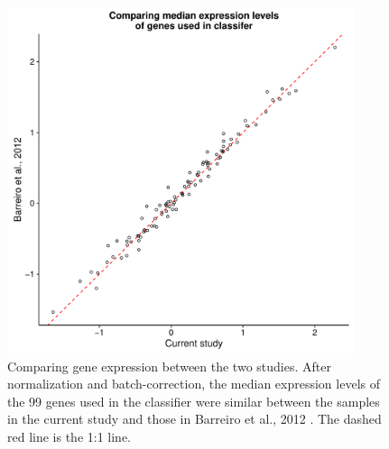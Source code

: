 \documentclass[fleqn,10pt]{wlscirep}
\begin{document}
\begin{figure}[ht]
\centering
\includegraphics[width=4in]{../figure/classifier-exp.pdf}
\caption{
Comparing gene expression between the two studies. After normalization
and batch-correction, the median expression levels of the 99 genes
used in the classifier were similar between the samples in the current
study and those in Barreiro et al., 2012 \cite{Barreiro2012}. The
dashed red line is the 1:1 line.
}
\label{fig:class-exp}
\end{figure}
\end{document}
